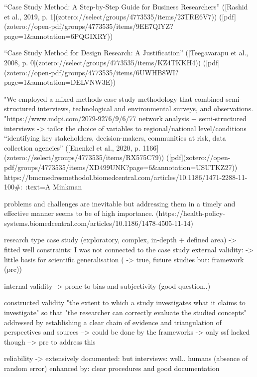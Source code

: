 “Case Study Method: A Step-by-Step Guide for Business Researchers” ([Rashid et al., 2019, p. 1](zotero://select/groups/4773535/items/23TRE6V7)) ([pdf](zotero://open-pdf/groups/4773535/items/9EE7QIYZ?page=1&annotation=6PQGIXRY))

“Case Study Method for Design Research: A Justification” ([Teegavarapu et al., 2008, p. 0](zotero://select/groups/4773535/items/KZ4TKKH4)) ([pdf](zotero://open-pdf/groups/4773535/items/6UWHB8WI?page=1&annotation=DELVNW3E))

"We employed a mixed methods case study methodology that combined semi-structured interviews, technological and environmental surveys, and observations. "https://www.mdpi.com/2079-9276/9/6/77
network analysis + semi-structured interviews -> tailor the choice of variables to regional/national level/conditions “identifying key stakeholders, decision-makers, communities at risk, data collection agencies” ([Enenkel et al., 2020, p. 1166](zotero://select/groups/4773535/items/RX575C79)) ([pdf](zotero://open-pdf/groups/4773535/items/XD499UNK?page=6&annotation=USUTKZ27))
https://bmcmedresmethodol.biomedcentral.com/articles/10.1186/1471-2288-11-100#:~:text=A%
Minkman

problems and challenges are inevitable but addressing them in a timely and effective manner seems to be of high importance. (https://health-policy-systems.biomedcentral.com/articles/10.1186/1478-4505-11-14)

research type case study (exploratory, complex, in-depth + defined area) -> fitted well
constraints: I was not connected to the case study
external validity: -> little basis for scientific generalisation (\autocites{yinCaseStudyResearch1984}[5]{zainalCaseStudyResearch2007} -> true, future studies but: framework (prc))

internal validity -> prone to bias and subjectivity (good question..)

constructed validity "the extent to which a study investigates what it claims to investigate" \autocite[3]{gibbertWhatPassesRigorous2008} so that "the researcher can correctly evaluate the studied concepts" \autocite[277]{ferreiraHowImproveValidity2020}
addressed by establishing a clear chain of evidence and triangulation of perspectives and sources --> could be done by the frameworks -> only ssf lacked though --> prc to address this


reliability -> extensively documented: but interviews: well.. humans (absence of random error)
enhanced by: clear procedures and good documentation

